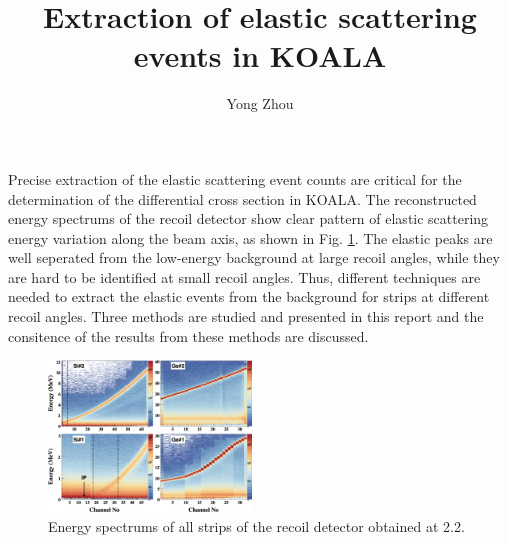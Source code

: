 \documentclass[fleqn,twocolumn,a4paper]{ikpar}
\begin{document}
\parindent=0pt
\frenchspacing

\title{{\bf
    Extraction of elastic scattering events in KOALA
}}
\author{Yong Zhou
}

\maketitle

Precise extraction of the elastic scattering event counts are critical for the
determination of the differential cross section in KOALA.
The reconstructed energy spectrums of the recoil detector show clear pattern of
elastic scattering energy variation along the beam axis, as shown in Fig. \ref{fig:energy_vs_strips}.
The elastic peaks are well seperated from the low-energy background at large
recoil angles, while they are hard to be identified at small recoil angles.
Thus, different techniques are needed to extract the elastic events from the
background for strips at different recoil angles.
Three methods are studied and presented in this report and the consitence of the results
from these methods are discussed.
\begin{figure}[!htb]
	\includegraphics[width=0.48\textwidth]{./energy_vs_strips.png}
  \caption{Energy spectrums of all strips of the recoil detector obtained at \SI{2.2}{\momentum}.}
  \label{fig:energy_vs_strips}
\end{figure}

\par
\medskip
\end{document}

